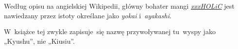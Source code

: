 \documentclass[a4paper,11pt]{article}
\begin{document}
\vspace{\spaceFour}



\start {} Według opisu na angielskiej Wikipedii, główny
bohater mangi
\href{https://en.wikipedia.org/wiki/XxxHolic}{\textit{xxxHOLiC}} jest
nawiedzany przez istoty określane jako \textit{yokai}
i~\textit{ayakashi}.

\vspace{\spaceFour}



\start {} W~książce tej zwykle zapisuje~się nazwę przywoływanej
tu~wyspy jako „Kyushu”, %
nie „Kiusiu”.





\end{document}
